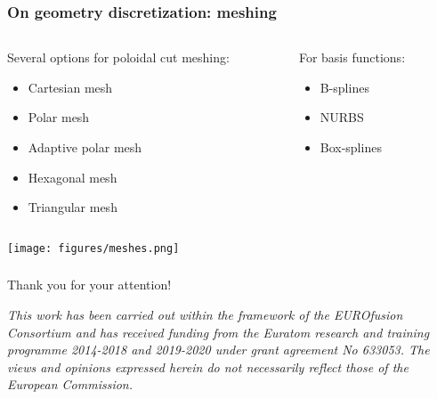 \documentclass[10pt]{beamer}
\begin{document}
\begin{frame}
\frametitle{On geometry discretization: meshing}


\begin{columns}
\begin{column}{0.6\textwidth}
Several options for poloidal cut meshing:

\begin{itemize}
	\item Cartesian mesh
	\item Polar mesh
	\item Adaptive polar mesh
	\item Hexagonal mesh
	\item Triangular mesh
\end{itemize}

\end{column}
\begin{column}{0.4\textwidth}

For basis functions:

\begin{itemize}
	\item B-splines
	\item NURBS
	\item Box-splines
\end{itemize}
\end{column}
\end{columns}



\begin{center}
    	\texttt{[image: figures/meshes.png]}
\end{center}
\vspace{-0.5cm}
\end{frame}




\begin{frame}
\frametitle{}
{\centering
{\Huge Thank you for your attention!}}
\vspace{3cm}

{\footnotesize \emph{ This work has been carried out within the framework of the EUROfusion Consortium and has received funding from the Euratom research and training programme 2014-2018 and 2019-2020 under grant agreement No 633053. The views and opinions expressed herein do not necessarily reflect those of the European Commission.}}
\end{frame}
\end{document}
